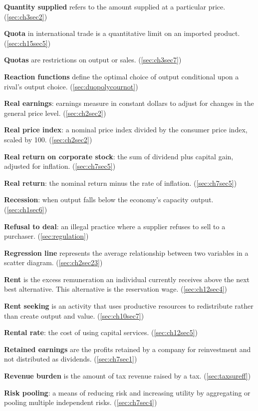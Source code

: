 \textbf{Quantity supplied} refers to the amount supplied at a particular price. (\ref{sec:ch3sec2})

\textbf{Quota} in international trade is a quantitative limit on an imported product. (\ref{sec:ch15sec5})

\textbf{Quotas} are restrictions on output or sales. (\ref{sec:ch3sec7})

\textbf{Reaction functions} define the optimal choice of output conditional upon a rival's output choice. (\ref{sec:duopolycournot})

\textbf{Real earnings}: earnings measure in constant dollars to adjust for changes in the general price level. (\ref{sec:ch2sec2})

\textbf{Real price index}: a nominal price index divided by the consumer price index, scaled by 100. (\ref{sec:ch2sec2})

\textbf{Real return on corporate stock}: the sum of dividend plus capital gain, adjusted for inflation. (\ref{sec:ch7sec5})

\textbf{Real return}: the nominal return minus the rate of inflation. (\ref{sec:ch7sec5})

\textbf{Recession}: when output falls below the economy's capacity output. (\ref{sec:ch1sec6})

\textbf{Refusal to deal}: an illegal practice where a supplier refuses to sell to a purchaser. (\ref{sec:regulation})

\textbf{Regression line} represents the average relationship between two variables in a scatter diagram. (\ref{sec:ch2sec23})

\textbf{Rent} is the excess remuneration an individual currently receives above the next best alternative. This alternative is the reservation wage. (\ref{sec:ch12sec4})

\textbf{Rent seeking} is an activity that uses productive resources to redistribute rather than create output and value. (\ref{sec:ch10sec7})

\textbf{Rental rate}: the cost of using capital services. (\ref{sec:ch12sec5})

\textbf{Retained earnings} are the profits retained by a company for reinvestment and not distributed as dividends. (\ref{sec:ch7sec1})

\textbf{Revenue burden} is the amount of tax revenue raised by a tax. (\ref{sec:taxsureff})

\textbf{Risk pooling}: a means of reducing risk and increasing utility by aggregating or pooling multiple independent risks. (\ref{sec:ch7sec4})

